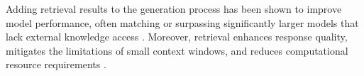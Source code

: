 Adding retrieval results to the generation process has been shown to improve model performance, often matching or surpassing significantly larger models that lack external knowledge access \cite{in-context}.
Moreover, retrieval enhances response quality, mitigates the limitations of small context windows, and reduces computational resource requirements \cite{Xu2023RetrievalML}.
